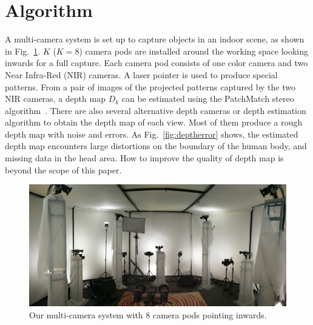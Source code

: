 \section{Algorithm}
\label{sec:overview}

A multi-camera system is set up to capture objects in an indoor scene, as shown in Fig.~\ref{fig:rig}.
%
$K$ ($K=8$) camera pods are installed around the working space looking inwards for a full capture.
Each camera pod consists of one color camera and two Near Infra-Red (NIR) cameras. A laser pointer is used to produce special patterns. 
From a pair of images of the projected patterns captured by the two NIR cameras, a depth map $D_k$ can be estimated using the PatchMatch stereo algorithm~\cite{Bleyer2011PatchMatch}.
There are also several alternative depth cameras or depth estimation algorithm to obtain the depth map of each view. Most of them produce a rough depth map with noise and errors.
As Fig.~\ref{fig:deptherror} shows, the estimated depth map encounters large distortions on the boundary of the human body, and missing data in the head area.
How to improve the quality of depth map is beyond the scope of this paper.

\begin{figure}
	\centering
	\includegraphics[width=\columnwidth]{image/rig.jpg}
	\caption{Our multi-camera system with 8 camera pods pointing inwards.}
	\label{fig:rig}
\end{figure}



